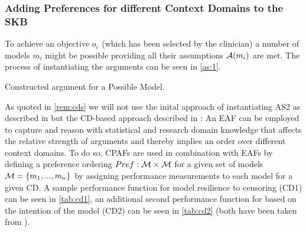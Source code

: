 \subsubsection{Adding Preferences for different Context Domains to the \gls{SKB}}
\label{sub:preferences}

To achieve an objective $o_c$ (which has been selected by the clinician) a number of models $m_i$ might be possible providing all their assumptions $\mathcal{A}(m_i)$ are met. The process of instantiating the arguments can be seen in \autoref{as:1}.

\begin{as}[h]
\centering
	\caption{Constructed argument for a Possible Model.\label{as:1}}
\end{as}

As quoted in \autoref{rem:cds} we will not use the inital approach of instantiating AS2 as described in \cite{sassoon2014} but the \gls{CD}-based approach described in \cite{sassoon2016CD,sassoon2016}: An \gls{EAF} can be employed to capture and reason with statistical and research domain knowledge that affects the relative strength of arguments and thereby implies an order over different context domains. To do so, \glspl{CPAF} are used in combination with \glspl{EAF} by defining a preference ordering $Pref : \mathcal{M} \times \mathcal{M}$ for a given set of models $\mathcal{M} = \{m_1, ..., m_n\}$ by assigning performance measurements to each model for a given \gls{CD}. A sample performance function for model resilience to censoring (CD1) can be seen in \autoref{tab:cd1}, an additional second performance function for based on the intention of the model (CD2) can be seen in \autoref{tab:cd2} (both have been taken from \cite{sassoon2016CD}).


